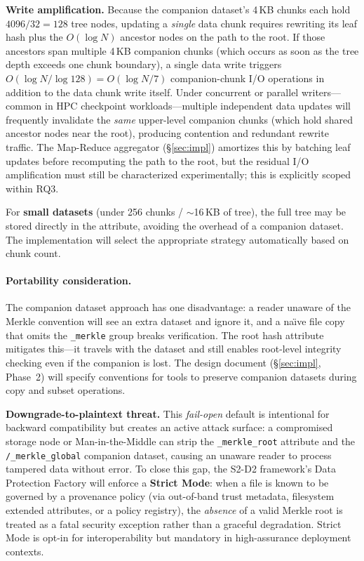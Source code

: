 \documentclass[11pt]{article}
\begin{document}
\noindent\textbf{Write amplification.}
Because the companion dataset's 4\,KB chunks each hold $4096/32 = 128$ tree
nodes, updating a \emph{single} data chunk requires rewriting its leaf hash
plus the $O(\log N)$ ancestor nodes on the path to the root.  If those
ancestors span multiple 4\,KB companion chunks (which occurs as soon as the
tree depth exceeds one chunk boundary), a single data write triggers
$O(\log N / \log 128) = O(\log N / 7)$ companion-chunk I/O operations in
addition to the data chunk write itself.  Under concurrent or parallel
writers---common in HPC checkpoint workloads---multiple independent data
updates will frequently invalidate the \emph{same} upper-level companion
chunks (which hold shared ancestor nodes near the root), producing contention
and redundant rewrite traffic.  The Map-Reduce aggregator (\S\ref{sec:impl})
amortizes this by batching leaf updates before recomputing the path to the
root, but the residual I/O amplification must still be characterized
experimentally; this is explicitly scoped within RQ3.

\noindent For \textbf{small datasets} (under 256 chunks / $\sim$16\,KB of tree),
the full tree may be stored directly in the attribute, avoiding the overhead of
a companion dataset. The implementation will select the appropriate strategy
automatically based on chunk count.

\paragraph{Portability consideration.}
The companion dataset approach has one disadvantage: a reader unaware of the
Merkle convention will see an extra dataset and ignore it, and a na\"{\i}ve
file copy that omits the \texttt{\_merkle} group breaks verification. The root
hash attribute mitigates this---it travels with the dataset and still enables
root-level integrity checking even if the companion is lost. The design
document (\S\ref{sec:impl}, Phase~2) will specify conventions for tools to
preserve companion datasets during copy and subset operations.

\noindent\textbf{Downgrade-to-plaintext threat.}
This \emph{fail-open} default is intentional for backward compatibility but
creates an active attack surface: a compromised storage node or
Man-in-the-Middle can strip the \texttt{\_merkle\_root} attribute and the
\texttt{/\_merkle\_global} companion dataset, causing an unaware reader to
process tampered data without error. To close this gap, the S2-D2 framework's
Data Protection Factory will enforce a \textbf{Strict Mode}: when a file is
known to be governed by a provenance policy (via out-of-band trust metadata,
filesystem extended attributes, or a policy registry), the \emph{absence} of
a valid Merkle root is treated as a fatal security exception rather than a
graceful degradation. Strict Mode is opt-in for interoperability but mandatory
in high-assurance deployment contexts.
\end{document}
